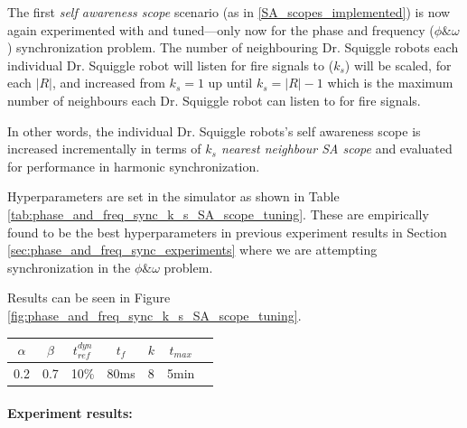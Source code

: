 				The first \textit{self awareness scope} scenario (as in \ref{SA_scopes_implemented}) is now again experimented with and tuned—only now for the phase and frequency ($\phi \& \omega$) synchronization problem. The number of neighbouring Dr. Squiggle robots each individual Dr. Squiggle robot will listen for fire signals to ($k_s$) will be scaled, for each $|R|$, and increased from $k_s=1$ up until $k_s=|R|-1$ which is the maximum number of neighbours each Dr. Squiggle robot can listen to for fire signals.
				
				In other words, the individual Dr. Squiggle robots's self awareness scope is increased incrementally in terms of \textit{$k_s$ nearest neighbour SA scope} and evaluated for performance in harmonic synchronization.

				Hyperparameters are set in the simulator as shown in Table \ref{tab:phase_and_freq_sync_k_s_SA_scope_tuning}. These are empirically found to be the best hyperparameters in previous experiment results in Section \ref{sec:phase_and_freq_sync_experiments} where we are attempting synchronization in the $\phi \& \omega$ problem.
				
				Results can be seen in Figure \ref{fig:phase_and_freq_sync_k_s_SA_scope_tuning}.

				\begin{center}
				\begin{tabular}{ |c|c|c|c|c|c|c| } 
				\hline
				$\alpha$ & $\beta$ & $t_{ref}^{dyn}$ & $t_f$ & $k$ & $t_{max}$ \\
				\hline
				0.2 & 0.7 & 10\% & 80ms & 8 & 5min \\
				\hline
				\end{tabular}
				\label{tab:phase_and_freq_sync_k_s_SA_scope_tuning}
				\end{center}

				\paragraph{Experiment results:\nl}
				
